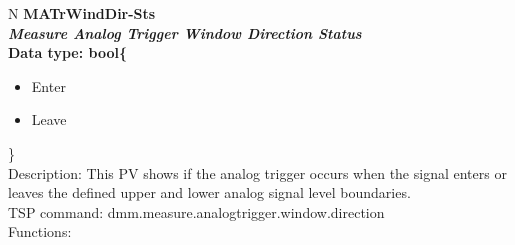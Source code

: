 \documentclass[openany]{article}
\begin{document}
		\begin{tabular}{N}
			\hline
			\bfseries MATrWindDir-Sts\label{pv:matrwinddir-sts} \\ \hline
			\emph{Measure Analog Trigger Window Direction Status} \\
			Data type: bool\{\begin{itemize}[noitemsep]
				\small
				\item[] Enter
				\item[] Leave
			\end{itemize}\} \\
			Description: This PV shows if the analog trigger occurs when the signal enters or leaves the defined upper and lower analog signal level boundaries. \\
			TSP command: dmm.measure.analogtrigger.window.direction \\
			Functions: \\
			\arrayrulecolor{\FuncTableBorderColor}

		\end{tabular}
\end{document}
